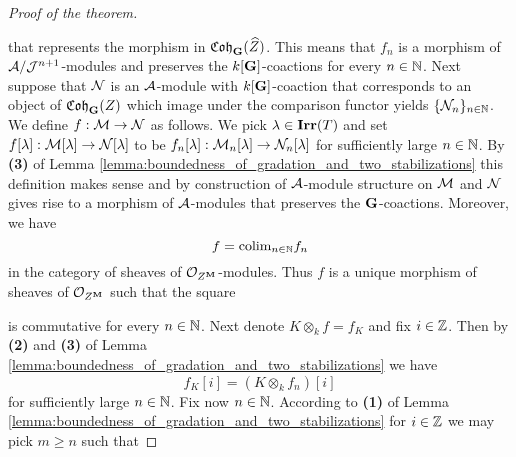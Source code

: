 \begin{proof}[Proof of the theorem]
\begin{center}
\end{center}
that represents the morphism in $\mathfrak{Coh}_{\mathbf{G}}(\widehat{Z})$. This means that $f_n$ is a morphism of ${\mathcal A}/{\mathcal J}^{n+1}$-modules and preserves the $k[\mathbf{G}]$-coactions for every $n\in {\mathbb N}$. Next suppose that ${\mathcal N}$ is an ${\mathcal A}$-module with $k[\mathbf{G}]$-coaction that corresponds to an object of $\mathfrak{Coh}_{\mathbf{G}}(Z)$ which image under the comparison functor yields $\{{\mathcal N}_n\}_{n\in {\mathbb N}}$. We define $f:{\mathcal M} \rightarrow {\mathcal N}$ as follows. We pick $\lambda\in \mathbf{Irr}(T)$ and set $f[\lambda]:{\mathcal M}[\lambda]\rightarrow {\mathcal N}[\lambda]$ to be $f_n[\lambda]:{\mathcal M}_n[\lambda]\rightarrow {\mathcal N}_n[\lambda]$ for sufficiently large $n\in {\mathbb N}$. By \textbf{(3)} of Lemma \ref{lemma:boundedness_of_gradation_and_two_stabilizations} this definition makes sense and by construction of ${\mathcal A}$-module structure on ${\mathcal M}$ and ${\mathcal N}$ gives rise to a morphism of ${\mathcal A}$-modules that preserves the $\mathbf{G}$-coactions. Moreover, we have
$$f = \mathrm{colim}_{n\in {\mathbb N}}f_n$$
in the category of sheaves of ${\mathcal O}_{Z^{\mathbf{M}}}$-modules. Thus $f$ is a unique morphism of sheaves of ${\mathcal O}_{Z^{\mathbf{M}}}$ such that the square
\begin{center}
\end{center}
is commutative for every $n\in {\mathbb N}$. Next denote $K\otimes_k f = f_K$ and fix $i\in {\mathbb Z}$. Then by \textbf{(2)} and \textbf{(3)} of Lemma \ref{lemma:boundedness_of_gradation_and_two_stabilizations} we have
$$f_K[i] = (K\otimes_kf_n)[i]$$
for sufficiently large $n\in {\mathbb N}$. Fix now $n\in {\mathbb N}$. According to \textbf{(1)} of Lemma \ref{lemma:boundedness_of_gradation_and_two_stabilizations} for $i\in {\mathbb Z}$ we may pick $m\geq n$ such that

\end{proof}

